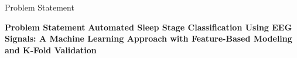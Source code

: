 \begin{frame}{Problem Statement}
	\begin{block}{\centering \textbf{Problem Statement}}
		\centering
		\textbf{Automated Sleep Stage Classification Using EEG Signals: A Machine Learning Approach with Feature-Based Modeling and K-Fold Validation}
	\end{block}
\end{frame}
